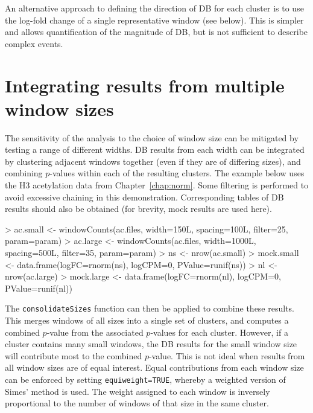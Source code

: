 \documentclass[12pt]{report}
\renewenvironment{Schunk}{\vspace{0pt}}{\vspace{0pt}}
\newcommand{\code}[1]{{\small\texttt{#1}}}
\begin{document}
An alternative approach to defining the direction of DB for each cluster is to use the log-fold change of a single representative window (see below).
This is simpler and allows quantification of the magnitude of DB, but is not sufficient to describe complex events.

\section{Integrating results from multiple window sizes}
\label{sec:bin_integrate}
The sensitivity of the analysis to the choice of window size can be mitigated by testing a range of different widths.
DB results from each width can be integrated by clustering adjacent windows together (even if they are of differing sizes), and combining $p$-values within each of the resulting clusters.
The example below uses the H3 acetylation data from Chapter~\ref{chap:norm}.
Some filtering is performed to avoid excessive chaining in this demonstration.
Corresponding tables of DB results should also be obtained (for brevity, mock results are used here).

\begin{Schunk}
\begin{Sinput}
> ac.small <- windowCounts(ac.files, width=150L, spacing=100L, filter=25, param=param)
> ac.large <- windowCounts(ac.files, width=1000L, spacing=500L, filter=35, param=param)
> ns <- nrow(ac.small)
> mock.small <- data.frame(logFC=rnorm(ns), logCPM=0, PValue=runif(ns)) 
> nl <- nrow(ac.large)
> mock.large <- data.frame(logFC=rnorm(nl), logCPM=0, PValue=runif(nl)) 
\end{Sinput}
\end{Schunk}

The \code{consolidateSizes} function can then be applied to combine these results.
This merges windows of all sizes into a single set of clusters, and computes a combined $p$-value from the associated $p$-values for each cluster.
However, if a cluster contains many small windows, the DB results for the small window size will contribute most to the combined $p$-value.
This is not ideal when results from all window sizes are of equal interest.
Equal contributions from each window size can be enforced by setting \code{equiweight=TRUE}, whereby a weighted version of Simes' method \citep{benjamini1997} is used.
The weight assigned to each window is inversely proportional to the number of windows of that size in the same cluster.
\end{document}
